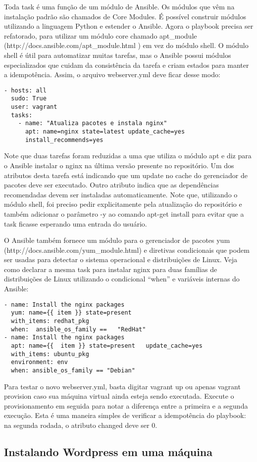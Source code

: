 Toda task é uma função de um módulo de Ansible. 
Os módulos que vêm na instalação padrão são chamados de 
Core Modules. É possível construir módulos utilizando a 
linguagem Python e estender o Ansible. Agora o playbook 
precisa ser refatorado, para utilizar um módulo core chamado 
apt\_module (http://docs.ansible.com/apt\_module.html ) 
em vez do módulo shell. O módulo shell é útil para 
automatizar muitas tarefas, mas o Ansible possui módulos 
especializados que cuidam da consistência da tarefa e 
criam estados para manter a idempotência. Assim, o 
arquivo webserver.yml deve ficar desse modo:
\begin{lstlisting}
- hosts: all
  sudo: True
  user: vagrant
  tasks:
    - name: "Atualiza pacotes e instala nginx"
      apt: name=nginx state=latest update_cache=yes
      install_recommends=yes

\end{lstlisting}
Note que duas tarefas foram reduzidas a uma que utiliza 
o módulo apt e diz para o Ansible instalar o nginx na 
última versão presente no repositório. Um dos atributos 
desta tarefa está indicando que um update no cache do 
gerenciador de pacotes deve ser executado. Outro atributo 
indica que as dependências recomendadas devem ser instaladas 
automaticamente. Note que, utilizando o módulo shell, foi 
preciso pedir explicitamente pela atualização do 
repositório e também adicionar o parâmetro -y ao comando 
apt-get install para evitar que a task ficasse esperando 
uma entrada do usuário.

O Ansible também fornece um módulo para o gerenciador 
de pacotes yum (http://docs.ansible.com/yum\_module.html) 
e diretivas condicionais que podem ser usadas para 
detectar o sistema operacional e distribuições de Linux. 
Veja como declarar a mesma task para instalar nginx para 
duas famílias de distribuições de Linux utilizando 
o condicional “when” e variáveis internas do Ansible:
\begin{lstlisting}
- name: Install	the nginx packages
  yum: name={{ item }} state=present
  with_items: redhat_pkg
  when:	 ansible_os_family ==	"RedHat"
- name: Install	the nginx packages
  apt: name={{	item }} state=present	update_cache=yes
  with_items: ubuntu_pkg
  environment: env
  when: ansible_os_family == "Debian"
\end{lstlisting}
Para testar o novo webserver.yml, basta digitar vagrant up ou 
apenas vagrant provision caso sua máquina virtual ainda esteja 
sendo executada. Execute o provisionamento em seguida para 
notar a diferença entre a primeira e a segunda execução. 
Esta é uma maneira simples de verificar a idempotência 
do playbook: na segunda rodada, o atributo changed deve ser 0.

\subsection{Instalando Wordpress em uma máquina}

